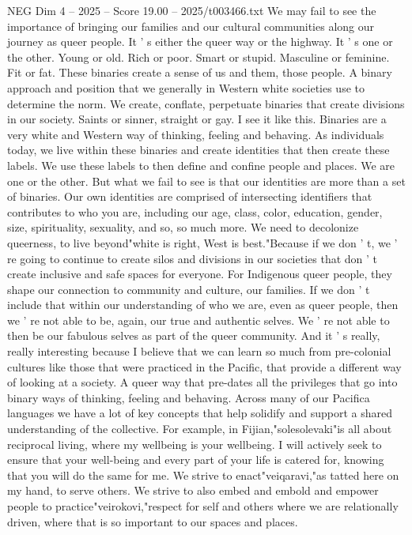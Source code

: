 \begin{textsample}{NEG Dim 4 – 2025 – Score 19.00 – 2025/t003466.txt}
We may fail to see the importance of bringing our families and our cultural communities along our journey as queer people.
It ' s either the queer way or the highway.
It ' s one or the other.
Young or old.
Rich or poor.
Smart or stupid.
Masculine or feminine.
Fit or fat.
These binaries create a sense of us and them, those people.
A binary approach and position that we generally in Western white societies use to determine the norm.
We create, conflate, perpetuate binaries that create divisions in our society.
Saints or sinner, straight or gay.
I see it like this.
Binaries are a very white and Western way of thinking, feeling and behaving.
As individuals today, we live within these binaries and create identities that then create these labels.
We use these labels to then define and confine people and places.
We are one or the other.
But what we fail to see is that our identities are more than a set of binaries.
Our own identities are comprised of intersecting identifiers that contributes to who you are, including our age, class, color, education, gender, size, spirituality, sexuality, and so, so much more.
We need to decolonize queerness, to live beyond"white is right, West is best."Because if we don ' t, we ' re going to continue to create silos and divisions in our societies that don ' t create inclusive and safe spaces for everyone.
For Indigenous queer people, they shape our connection to community and culture, our families.
If we don ' t include that within our understanding of who we are, even as queer people, then we ' re not able to be, again, our true and authentic selves.
We ' re not able to then be our fabulous selves as part of the queer community.
And it ' s really, really interesting because I believe that we can learn so much from pre-colonial cultures like those that were practiced in the Pacific, that provide a different way of looking at a society.
A queer way that pre-dates all the privileges that go into binary ways of thinking, feeling and behaving.
Across many of our Pacifica languages we have a lot of key concepts that help solidify and support a shared understanding of the collective.
For example, in Fijian,"solesolevaki"is all about reciprocal living, where my wellbeing is your wellbeing.
I will actively seek to ensure that your well-being and every part of your life is catered for, knowing that you will do the same for me.
We strive to enact"veiqaravi,"as tatted here on my hand, to serve others.
We strive to also embed and embold and empower people to practice"veirokovi,"respect for self and others where we are relationally driven, where that is so important to our spaces and places.

\end{textsample}
